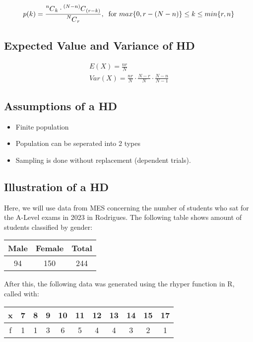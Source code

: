 \documentclass{article}
\newcommand\Mycomb[2][^n]{\prescript{#1\mkern-0.5mu}{}C_{#2}}
\begin{document}
\begin{gather*}
  p(k) =  \frac{\Mycomb[n]{k} \cdot \Mycomb[(N-n)]{(r-k)}}
  {\Mycomb[N]{r}}, \; \;
  \text{for } max\{ 0, r - (N - n) \} \leq k \leq min\{r, n\}
\end{gather*}

\subsection{Expected Value and Variance of HD}
\begin{gather*}
  E(X) = \frac{nr}{N} \\[5pt]
  Var(X) = \frac{nr}{N} \cdot \frac{N -r}{N} \cdot \frac{N-n}{N-1}
\end{gather*}

\subsection{Assumptions of a HD}
\begin{itemize}
  \item Finite population
  \item Population can be seperated into 2 types
  \item Sampling is done without replacement (dependent trials).
\end{itemize}

\subsection{Illustration of a HD}
Here, we will use data from MES concerning the number of students
who sat for the A-Level exams in 2023 in Rodrigues. The following
table shows amount of students classified by gender:

\begin{center}
  \begin{tabular}{|c|c|c|}
    \hline
    \textbf{Male} & \textbf{Female} & \textbf{Total} \\
    \hline
    \hline
    94 & 150 & 244 \\
    \hline
  \end{tabular}
\end{center}


After this, the following data was generated using the rhyper
function in R, called with:

\begin{center}
  \begin{tabular}{|c|c|c|c|c|c|c|c|c|c|c|}
    \hline
    x & 7 & 8 & 9 & 10 & 11 & 12 & 13 & 14 & 15 & 17 \\
    \hline
    f & 1 & 1 & 3 & 6 & 5 & 4 & 4 & 3 & 2 & 1 \\
    \hline
  \end{tabular}
\end{center}
\end{document}
